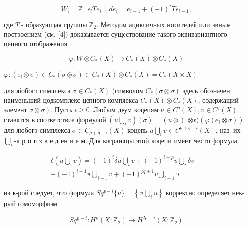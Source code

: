 \documentclass[10pt]{article}
\begin{document}
\[

W_{\mathfrak{i}}=\mathbb{Z}\left[e_{i} T e_{i}\right], d e_{i}=e_{i-1}+(-1)^{i} T e_{i-1},

\]



где $T$ - образующая групшы $\mathbb{Z}_{2}$. Методом ацикличных носителей или явным построением (см. [4]) доказывается существование такого эквивариантного цепного отображения



\[

\varphi: W \otimes C_{*}(X) \longrightarrow C_{*}(X) \otimes C_{*}(X)

\]



$\varphi:\left(e_{i} \otimes \sigma\right) \in C_{*}(\sigma \otimes \sigma) \subset C_{*}(X) \otimes C_{*}(X)=C_{*}(X \times X)$



для ліобого симплекса $\sigma \in C_{*}(X)$ (символом $C_{*}(\sigma \otimes \sigma)$ здесь обозначен наименьший цодкомплекс цепного комплекса $C_{*}(X) \otimes C_{*}(X)$, содержащий элемент $\left.\sigma \otimes \sigma\right)$. Пусть $i \geqslant 0$. Любым двум коцепям $u \in C^{p}(X), v \in C^{q}(X)$ ставится в соответствие формулой $\left(u \bigcup_{i} v\right)(\sigma)=(u \otimes)$ $\otimes v)\left(\varphi\left(e_{i} \otimes \sigma\right)\right)$ для любого симплекса $\sigma \in C_{p+q-i}(X)$ коцепь $u \bigcup_{i} v \in C^{p+q-i}(X)$, наз. их $\bigcup_{i}$-п р о и з в е д ен и е м. Для кограницы этой коцепи имеет место формула



\[

\begin{gathered}

\delta\left(u \bigcup_{i} v\right)=(-1)^{i} \delta u \bigcup_{i} v+(-1)^{i+p} u \bigcup_{i} \delta v+ \\

+(-1)^{i+1} u \bigcup_{i-1} v+(-1)^{p q+1} v \bigcup_{i-1} u

\end{gathered}

\]



из к-рой следует, что формула $S q^{p-i}\{u\}=\left\{u \bigcup_{i} u\right\}$ корректно определяет нек-рый гомоморфизм



\[

S q^{p-i}: H^{p}\left(X ; \mathbb{Z}_{2}\right) \rightarrow H^{2 p-i}\left(X ; \mathbb{Z}_{2}\right)

\]
\end{document}
